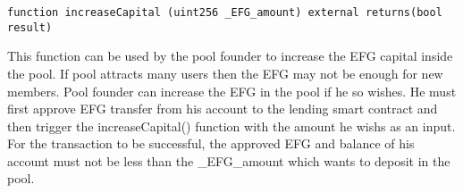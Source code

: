 \documentclass{article}
\begin{document}
\begin{lstlisting}[language=Solidity,numbers=none,escapechar=@]
function increaseCapital (uint256 _EFG_amount) external returns(bool result)
\end{lstlisting}

This function can be used by the pool founder to increase the EFG capital inside the pool. If pool attracts many users then the EFG may not be enough for new members. Pool founder can increase the EFG in the pool if he so wishes. He must first approve EFG transfer from his account to the lending smart contract and then trigger the increaseCapital() function with the amount he wishs as an input. For the transaction to be successful, the approved EFG and balance of his account must not be less than the \_EFG\_amount which wants to deposit in the pool.
\end{document}
